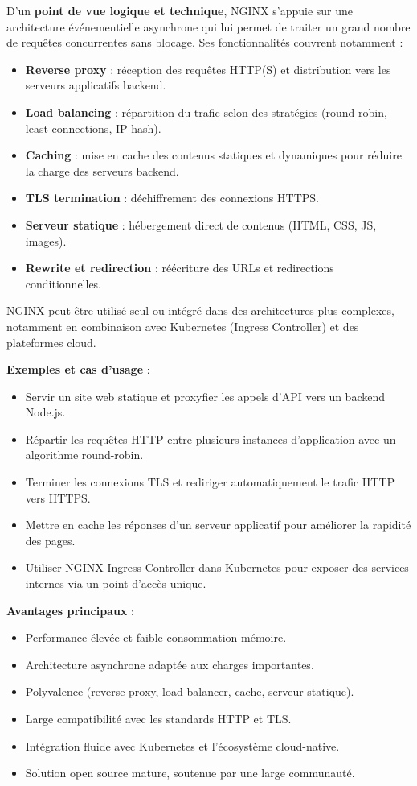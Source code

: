D’un \textbf{point de vue logique et technique}, NGINX s’appuie sur une architecture événementielle asynchrone qui lui permet de traiter un grand nombre de requêtes concurrentes sans blocage. Ses fonctionnalités couvrent notamment  :
\begin{itemize}
	\item \textbf{Reverse proxy}  : réception des requêtes HTTP(S) et distribution vers les serveurs applicatifs backend.
	\item \textbf{Load balancing}  : répartition du trafic selon des stratégies (round-robin, least connections, IP hash).
	\item \textbf{Caching}  : mise en cache des contenus statiques et dynamiques pour réduire la charge des serveurs backend.
	\item \textbf{TLS termination}  : déchiffrement des connexions HTTPS.
	\item \textbf{Serveur statique}  : hébergement direct de contenus (HTML, CSS, JS, images).
	\item \textbf{Rewrite et redirection}  : réécriture des URLs et redirections conditionnelles.
\end{itemize}

NGINX peut être utilisé seul ou intégré dans des architectures plus complexes, notamment en combinaison avec Kubernetes (Ingress Controller) et des plateformes cloud.

\textbf{Exemples et cas d’usage} :
\begin{itemize}
	\item Servir un site web statique et proxyfier les appels d’API vers un backend Node.js.
	\item Répartir les requêtes HTTP entre plusieurs instances d’application avec un algorithme round-robin.
	\item Terminer les connexions TLS et rediriger automatiquement le trafic HTTP vers HTTPS.
	\item Mettre en cache les réponses d’un serveur applicatif pour améliorer la rapidité des pages.
	\item Utiliser NGINX Ingress Controller dans Kubernetes pour exposer des services internes via un point d’accès unique.
\end{itemize}

\textbf{Avantages principaux} :
\begin{itemize}
	\item Performance élevée et faible consommation mémoire.
	\item Architecture asynchrone adaptée aux charges importantes.
	\item Polyvalence (reverse proxy, load balancer, cache, serveur statique).
	\item Large compatibilité avec les standards HTTP et TLS.
	\item Intégration fluide avec Kubernetes et l’écosystème cloud-native.
	\item Solution open source mature, soutenue par une large communauté.
\end{itemize}

